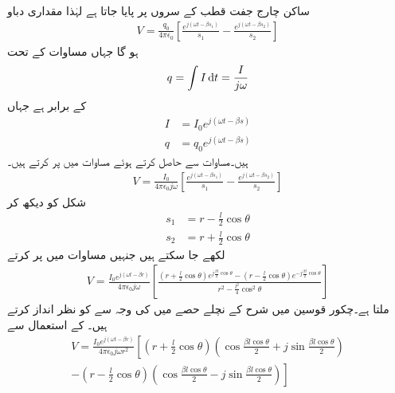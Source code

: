 ساکن چارج جفت قطب کے سروں پر پایا جاتا ہے لہٰذا مقداری دباو
\begin{align}\label{مساوات_اینٹینا_مقداری_دباو_الف}
V=\frac{q_0}{4\pi \epsilon_0} \left[\frac{e^{j(\omega t -\beta s_1)}}{s_1} -\frac{e^{j(\omega t -\beta s_2)}}{s_2}\right]
\end{align}
ہو گا جہاں مساوات  کے تحت
\begin{align}\label{مساوات_اینٹینا_رو_اور_چارج_ب}
q=\int I \dif t=\frac{I}{j\omega }
\end{align}
کے برابر ہے جہاں
\begin{align*}
I&=I_0 e^{j(\omega t -\beta s)}\\
q&=q_0  e^{j(\omega t -\beta s)}
\end{align*}
ہیں۔مساوات  سے  حاصل کرتے ہوئے مساوات  میں پر کرتے ہیں۔ 
\begin{align}\label{مساوات_اینٹینا_مقداری_دباو_ب}
V=\frac{I_0}{4\pi \epsilon_0 j \omega } \left[\frac{e^{j(\omega t -\beta s_1)}}{s_1} -\frac{e^{j(\omega t -\beta s_2)}}{s_2}\right]
\end{align}
شکل کو دیکھ کر
\begin{align*}
s_1&=r-\frac{l}{2}\cos \theta\\
s_2&=r+\frac{l}{2}\cos \theta
\end{align*}
لکھے جا سکتے ہیں جنہیں مساوات  میں پر کرتے
\begin{align}
V=\frac{I_0 e^{j(\omega t -\beta r)}}{4\pi \epsilon_0 j \omega}\left[\frac{(r+\frac{l}{2}\cos \theta) e^{j\frac{\beta l}{2}\cos \theta}-(r-\frac{l}{2}\cos \theta) e^{-j\frac{\beta l}{2}\cos \theta}}{r^2-\frac{l^2}{4}\cos^2 \theta} \right]
\end{align}
ملتا ہے۔چکور قوسین میں شرح کے نچلے حصے میں  کی وجہ سے   کو نظر انداز کرتے ہیں۔ کے استعمال سے
\begin{multline}\label{مساوات_اینٹینا_مقداری_دباو_پ}
V=\frac{I_0 e^{j(\omega t -\beta r)}}{4\pi \epsilon_0 j \omega r^2} \left[\left(r+\frac{l}{2}\cos \theta\right) \left(\cos \frac{\beta l \cos \theta}{2} +j \sin \frac{\beta l \cos \theta}{2}\right)\right.\\
-\left.\left(r-\frac{l}{2}\cos \theta\right) \left(\cos \frac{\beta l \cos \theta}{2} -j \sin \frac{\beta l \cos \theta}{2}\right) \right]
\end{multline}  
